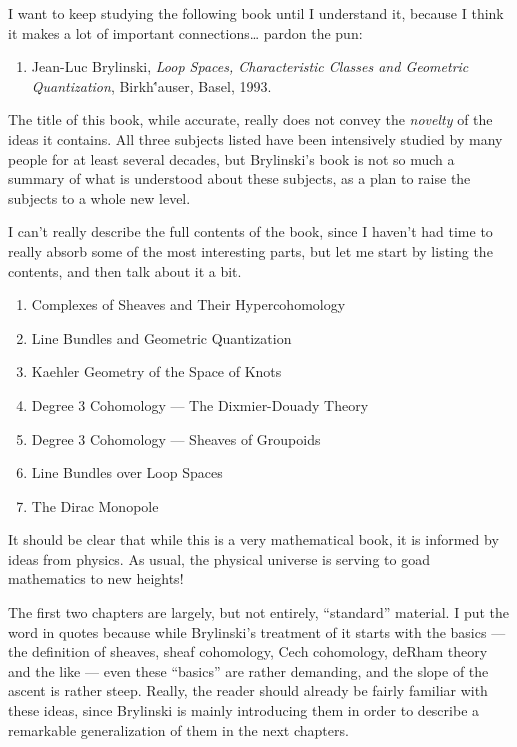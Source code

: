 \documentclass[12pt]{article}
\def\tightlist{}
\begin{document}
I want to keep studying the following book until I understand it,
because I think it makes a lot of important connections\ldots{} pardon
the pun:

\begin{enumerate}
\def\labelenumi{\arabic{enumi})}
\tightlist
\item
   Jean-Luc Brylinski, \emph{Loop Spaces, Characteristic Classes and Geometric Quantization},
  Birkh\''auser, Basel, 1993.
\end{enumerate}

The title of this book, while accurate, really does not convey the
\emph{novelty} of the ideas it contains. All three subjects listed have
been intensively studied by many people for at least several decades,
but Brylinski's book is not so much a summary of what is understood
about these subjects, as a plan to raise the subjects to a whole new
level.

I can't really describe the full contents of the book, since I haven't
had time to really absorb some of the most interesting parts, but let me
start by listing the contents, and then talk about it a bit.

\begin{enumerate}
\def\labelenumi{\arabic{enumi}.}
\tightlist
\item
  Complexes of Sheaves and Their Hypercohomology
\item
  Line Bundles and Geometric Quantization
\item
  Kaehler Geometry of the Space of Knots
\item
  Degree 3 Cohomology --- The Dixmier-Douady Theory
\item
  Degree 3 Cohomology --- Sheaves of Groupoids
\item
  Line Bundles over Loop Spaces
\item
  The Dirac Monopole
\end{enumerate}
\noindent
It should be clear that while this is a very mathematical book, it is
informed by ideas from physics. As usual, the physical universe is
serving to goad mathematics to new heights!

The first two chapters are largely, but not entirely, ``standard''
material. I put the word in quotes because while Brylinski's treatment
of it starts with the basics --- the definition of sheaves, sheaf
cohomology, Cech cohomology, deRham theory and the like --- even these
``basics'' are rather demanding, and the slope of the ascent is rather
steep. Really, the reader should already be fairly familiar with these
ideas, since Brylinski is mainly introducing them in order to describe a
remarkable generalization of them in the next chapters.
\end{document}
